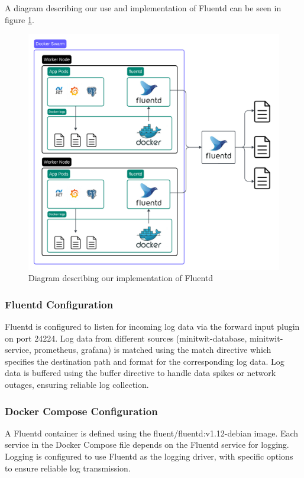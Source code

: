 A diagram describing our use and implementation of Fluentd can be seen in figure \ref{fig:logging2}.
\begin{figure}[H]
	\centering
	\includegraphics[width=1\textwidth]{Logging2.png}
	\caption{Diagram describing our implementation of Fluentd}
	\label{fig:logging2}
\end{figure}

\subsubsection*{Fluentd Configuration}

Fluentd is configured to listen for incoming log data via the forward input plugin on port 24224. 
Log data from different sources  (minitwit-database, minitwit-service, prometheus, grafana) is matched using the match directive which specifies the destination path and format for the corresponding log data. 
Log data is buffered using the buffer directive to handle data spikes or network outages, ensuring reliable log collection.

\subsubsection*{Docker Compose Configuration}

A Fluentd container is defined using the fluent/fluentd:v1.12-debian image. 
Each service in the Docker Compose file depends on the Fluentd service for logging. 
Logging is configured to use Fluentd as the logging driver, with specific options to ensure reliable log transmission. 

